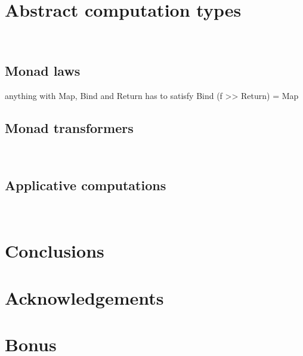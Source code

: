 \documentclass[runningheads,a4paper]{llncs}
\begin{document}
\section{Abstract computation types}
\label{sec:laws}
~

\subsection{Monad laws}
\label{sec:laws-monads}

anything with Map, Bind and Return has to satisfy Bind (f >> Return) = Map

\subsection{Monad transformers}
\label{sec:laws-transf}
~


\subsection{Applicative computations}
\label{sec:laws-appl}
~


\section{Conclusions}
\label{sec:conclusions}


\section*{Acknowledgements}






\appendix

\section{Bonus}
\end{document}
